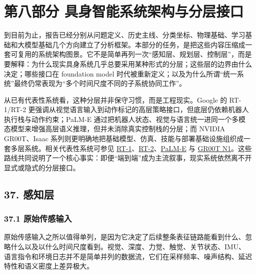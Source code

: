 
\part*{第八部分 具身智能系统架构与分层接口}

到目前为止，报告已经分别从问题定义、历史主线、分类坐标、物理基础、学习基础和大模型基础几个方向建立了分析框架。本部分的任务，是把这些内容压缩成一套可复用的系统架构图景。它不是简单再列一次“感知层、规划层、控制层”，而是要解释：为什么现实具身系统几乎总要采用某种形式的分层；这些层的边界由什么决定；哪些接口在 foundation model 时代被重新定义；以及为什么所谓“统一系统”最终仍常表现为“多个时间尺度不同的子系统协同工作”。

从已有代表性系统看，这种分层并非保守习惯，而是工程现实。Google 的 RT-1/RT-2 更强调从视觉语言输入到动作标记的高层策略接口，但底层仍依赖机器人执行栈与动作约束；PaLM-E 通过把机器人状态、视觉与语言统一进同一个多模态模型来增强高层语义推理，但并未消除真实控制栈的分层；而 NVIDIA GR00T、Isaac 系列则更明确地把基础模型、仿真、技能与部署基础设施组织成一套多层系统。相关代表性系统可参见 \href{https://robotics-transformer1.github.io/}{RT-1}、\href{https://robotics-transformer2.github.io/}{RT-2}、\href{https://arxiv.org/abs/2303.03378}{PaLM-E} 与 \href{https://developer.nvidia.com/blog/introducing-nvidia-isaac-gr00t-n1-an-open-foundation-model-for-humanoid-robot-development/}{GR00T N1}。这些路线共同说明了一个核心事实：即便“端到端”成为主流叙事，现实系统依然离不开显式或隐式的分层接口。

\chapter*{37. 感知层}

\section*{37.1 原始传感输入}


原始传感输入之所以值得单列，是因为它决定了后续整条表征链路能看到什么、忽略什么以及以什么时间尺度看到。视觉、深度、力觉、触觉、关节状态、IMU、语言指令和环境日志并不是简单并列的数据流，它们在采样频率、噪声结构、延迟特性和语义密度上差异极大。


